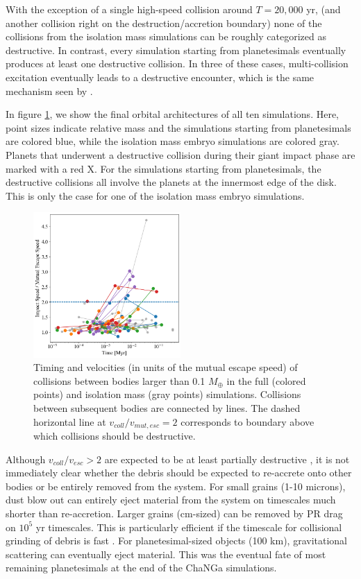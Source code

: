 With the exception of a single high-speed collision around $T = 20,000$ yr, (and another collision right on the destruction/accretion boundary) none of the collisions from the isolation mass simulations can be roughly categorized as destructive. In contrast, every simulation starting from planetesimals eventually produces at least one destructive collision. In three of these cases, multi-collision excitation eventually leads to a destructive encounter, which is the same mechanism seen by \cite{volk15}.

In figure \ref{fig:impact_iso_comp}, we show the final orbital architectures of all ten simulations. Here, point sizes indicate relative mass and the simulations starting from planetesimals are colored blue, while the isolation mass embryo simulations are colored gray. Planets that underwent a destructive collision during their giant impact phase are marked with a red X. For the simulations starting from planetesimals, the destructive collisions all involve the planets at the innermost edge of the disk. This is only the case for one of the isolation mass embryo simulations. 

\begin{figure}
\begin{center}
    \includegraphics[width=0.5\textwidth]{figures/stip/impact_iso_comp.png}
    \caption{Timing and velocities (in units of the mutual escape speed) of collisions between bodies larger than 0.1 $M_{\oplus}$ in the full (colored points) and isolation mass (gray points) simulations. Collisions between subsequent bodies are connected by lines. The dashed horizontal line at $v_{coll}/v_{mut,esc} = 2$ corresponds to boundary above which collisions should be destructive.\label{fig:impact_iso_comp}}
\end{center}
\end{figure}

Although $v_{coll}/v_{esc} > 2$ are expected to be at least partially destructive \cite{marcus09}, it is not immediately clear whether the debris should be expected to re-accrete onto other bodies or be entirely removed from the system. For small grains (1-10 microns), dust blow out can entirely eject material from the system on timescales much shorter than re-accretion. Larger grains (cm-sized) can be removed by PR drag on $10^{5}$ yr timescales. This is particularly efficient if the timescale for collisional grinding of debris is fast \cite{melis12}. For planetesimal-sized objects (100 km), gravitational scattering can eventually eject material. This was the eventual fate of most remaining planetesimals at the end of the {\sc ChaNGa} simulations.

